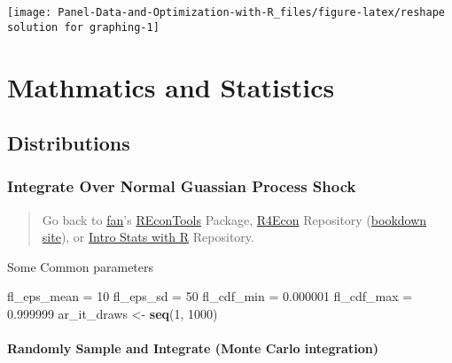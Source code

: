 \documentclass[
]{book}
\newenvironment{Shaded}{\begin{snugshade}}{\end{snugshade}}
\newcommand{\DecValTok}[1]{\textcolor[rgb]{0.00,0.00,0.81}{#1}}
\newcommand{\FloatTok}[1]{\textcolor[rgb]{0.00,0.00,0.81}{#1}}
\newcommand{\KeywordTok}[1]{\textcolor[rgb]{0.13,0.29,0.53}{\textbf{#1}}}
\newcommand{\NormalTok}[1]{#1}
\newcommand{\StringTok}[1]{\textcolor[rgb]{0.31,0.60,0.02}{#1}}
\begin{document}
\begin{center}\texttt{[image: Panel-Data-and-Optimization-with-R\_files/figure-latex/reshape solution for graphing-1]} \end{center}

\hypertarget{mathmatics-and-statistics}{%
\chapter{Mathmatics and Statistics}\label{mathmatics-and-statistics}}

\hypertarget{distributions}{%
\section{Distributions}\label{distributions}}

\hypertarget{integrate-over-normal-guassian-process-shock}{%
\subsection{Integrate Over Normal Guassian Process Shock}\label{integrate-over-normal-guassian-process-shock}}

\begin{quote}
Go back to \href{http://fanwangecon.github.io/}{fan}'s \href{https://fanwangecon.github.io/REconTools/}{REconTools} Package, \href{https://fanwangecon.github.io/R4Econ/}{R4Econ} Repository (\href{https://fanwangecon.github.io/R4Econ/bookdown}{bookdown site}), or \href{https://fanwangecon.github.io/Stat4Econ/}{Intro Stats with R} Repository.
\end{quote}

Some Common parameters

\begin{Shaded}
\begin{Highlighting}[]
\NormalTok{fl_eps_mean =}\StringTok{ }\DecValTok{10}
\NormalTok{fl_eps_sd =}\StringTok{ }\DecValTok{50}
\NormalTok{fl_cdf_min =}\StringTok{ }\FloatTok{0.000001}
\NormalTok{fl_cdf_max =}\StringTok{ }\FloatTok{0.999999}
\NormalTok{ar_it_draws <-}\StringTok{ }\KeywordTok{seq}\NormalTok{(}\DecValTok{1}\NormalTok{, }\DecValTok{1000}\NormalTok{)}
\end{Highlighting}
\end{Shaded}

\hypertarget{randomly-sample-and-integrate-monte-carlo-integration}{%
\subsubsection{Randomly Sample and Integrate (Monte Carlo integration)}\label{randomly-sample-and-integrate-monte-carlo-integration}}
\end{document}
